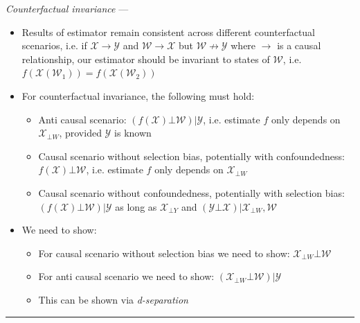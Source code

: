 \emph{Counterfactual invariance} --- 
\begin{itemize}
    \item Results of estimator remain consistent across different counterfactual scenarios, i.e. if $\mathcal{X} \to \mathcal{Y}$ and $\mathcal{W} \to \mathcal{X}$ but $\mathcal{W} \not\to \mathcal{Y}$ where $\to$ is a causal relationship, our estimator should be invariant to states of $\mathcal{W}$, i.e. $f(\mathcal{X}(\mathcal{W}_1)) = f(\mathcal{X}(\mathcal{W}_2))$
    \item For counterfactual invariance, the following must hold:
    \begin{itemize}
        \item Anti causal scenario: $(f(\mathcal{X}) \bot \mathcal{W}) | \mathcal{Y}$, i.e. estimate $f$ only depends on $\mathcal{X}_{\bot W}$, provided $\mathcal{Y}$ is known
        \item Causal scenario without selection bias, potentially with confoundedness: $f(\mathcal{X}) \bot \mathcal{W}$, i.e. estimate $f$ only depends on $\mathcal{X}_{\bot W}$
        \item Causal scenario without confoundedness, potentially with selection bias: $(f(\mathcal{X}) \bot \mathcal{W}) | \mathcal{Y}$ as long as $\mathcal{X}_{\bot Y}$ and $(\mathcal{Y} \bot \mathcal{X}) | \mathcal{X}_{\bot W}, \mathcal{W}$ 
    \end{itemize}
    \item We need to show:
    \begin{itemize}
        \item For causal scenario without selection bias we need to show: $\mathcal{X}_{\bot W} \bot \mathcal{W}$
        \item For anti causal scenario we need to show: $(\mathcal{X}_{\bot W} \bot \mathcal{W}) | \mathcal{Y}$
        \item This can be shown via \emph{d-separation}
    \end{itemize}
\end{itemize}

{\color{lightgray}\hrule height 0.001mm}

